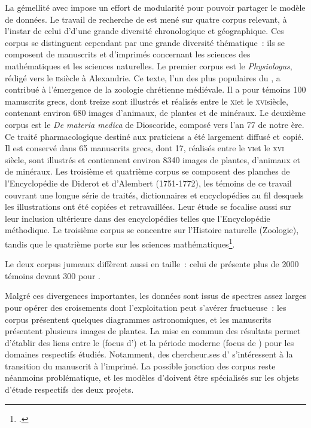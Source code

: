 La gémellité avec \vhs impose un effort de modularité pour pouvoir
partager le modèle de données. Le travail de recherche de \vhs est mené
sur quatre corpus relevant, à l'instar de celui d'\eida d'une grande
diversité chronologique et géographique. Ces corpus se distinguent
cependant par une grande diversité thématique~: ils se composent de
manuscrits et d'imprimés concernant les sciences des mathématiques et
les sciences naturelles. Le premier corpus est le \emph{Physiologus},
rédigé vers le \textsc{ii}\ieme siècle à Alexandrie. Ce texte, l'un des plus
populaires du \ma, a contribué à l'émergence de la zoologie
chrétienne médiévale. Il a pour témoins 100 manuscrits grecs, dont treize
sont illustrés et réalisés entre le \textsc{xi}\ieme et le \textsc{xvi}\ieme siècle, contenant
environ 680 images d'animaux, de plantes et de minéraux. Le deuxième
corpus est le \emph{De materia medica} de Dioscoride, composé vers l'an
77 de notre ère. Ce traité pharmacologique destiné aux praticiens a été
largement diffusé et copié. Il est conservé dans 65 manuscrits grecs,
dont 17, réalisés entre le \textsc{vi}\ieme et le \textsc{xvi}\ieme{} siècle, sont illustrés et
contiennent environ 8340 images de plantes, d'animaux et de minéraux.
Les troisième et quatrième corpus se composent des planches de
l'Encyclopédie de Diderot et d'Alembert (1751-1772), les témoins de ce
travail couvrant une longue série de traités, dictionnaires et
encyclopédies au fil desquels les illustrations ont été copiées et
retravaillées. Leur étude se focalise aussi sur leur inclusion
ultérieure dans des encyclopédies telles que l'Encyclopédie méthodique.
Le troisième corpus se concentre sur l'Histoire naturelle (Zoologie),
tandis que le quatrième porte sur les sciences mathématiques\footcite{noauthor_vhs_nodate}.

Le deux corpus jumeaux diffèrent aussi en taille~: celui de \vhs présente plus de 2000 témoins devant 300 pour \eida.

Malgré ces divergences importantes, les données sont issus de spectres
assez larges pour opérer des croisements dont l'exploitation peut
s'avérer fructueuse~: les corpus \vhs présentent quelques diagrammes
astronomiques, et les manuscrits \eida présentent plusieurs images de
plantes. La mise en commun des résultats permet d'établir des liens
entre le \ma (focus d'\eida) et la période moderne (focus de \vhs)
pour les domaines respectifs étudiés. Notamment, des chercheur.ses d'\eida
s'intéressent à la transition du manuscrit à l'imprimé. La possible
jonction des corpus reste néanmoins problématique, et les modèles d'\ia doivent être spécialisés sur les objets d'étude respectifs des deux projets.

